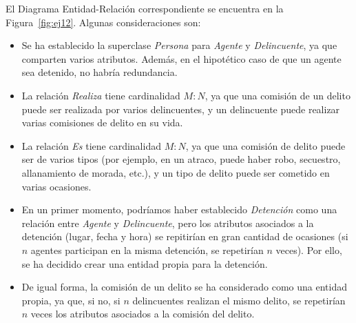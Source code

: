 \begin{ejercicio}
    El Diagrama Entidad-Relación correspondiente se encuentra en la Figura~\ref{fig:ej12}. Algunas consideraciones son:
    \begin{itemize}
        \item Se ha establecido la superclase \emph{Persona} para \emph{Agente} y \emph{Delincuente}, ya que comparten varios atributos.
        Además, en el hipotético caso de que un agente sea detenido, no habría redundancia.
        \item La relación \emph{Realiza} tiene cardinalidad $M:N$, ya que una comisión de un delito puede ser realizada por varios delincuentes, y un delincuente puede realizar varias comisiones de delito en su vida.
        \item La relación \emph{Es} tiene cardinalidad $M:N$, ya que una comisión de delito puede ser de varios tipos (por ejemplo, en un atraco, puede haber robo, secuestro, allanamiento de morada, etc.), y un tipo de delito puede ser cometido en varias ocasiones.
        \item En un primer momento, podríamos haber establecido \emph{Detención} como una relación entre \emph{Agente} y \emph{Delincuente}, pero los atributos asociados a la detención (lugar, fecha y hora) se repitirían en gran cantidad de ocasiones (si $n$ agentes participan en la misma detención, se repetirían $n$ veces).
        Por ello, se ha decidido crear una entidad propia para la detención.
        \item De igual forma, la comisión de un delito se ha considerado como una entidad propia, ya que, si no, si $n$ delincuentes realizan el mismo delito, se repetirían $n$ veces los atributos asociados a la comisión del delito.
    \end{itemize}
    \begin{figure}
        \centering
\end{figure}
\end{ejercicio}

